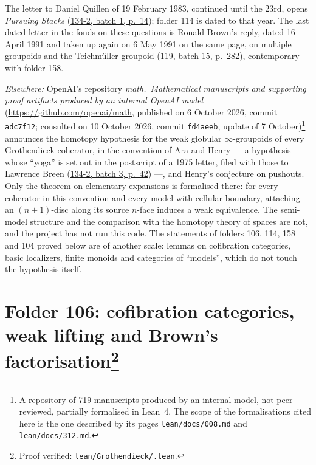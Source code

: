 \documentclass[11pt]{article}
\newcommand{\q}[1]{“#1”}
\newcommand{\lot}[3]{\href{https://grothendieck.commutator.io/\##1/#2/p#3}{#1, batch #2, p.~#3}}
\newcommand{\verifie}[1]{\footnote{Proof verified: \href{https://github.com/Commutator-IO/grothendieck-project/blob/article-lean-2026-10/lean/Grothendieck/#1.lean}{\texttt{lean/Grothendieck/\detokenize{#1}.lean}}.}}
\newcommand{\lettres}[1]{{\small #1\par}\medskip}
\newcommand{\ailleurs}[1]{{\small\textit{Elsewhere:} #1\par}\medskip}
\theoremstyle{plain}
\theoremstyle{definition}
\theoremstyle{remark}
\begin{document}
\lettres{The letter to Daniel Quillen of 19 February 1983, continued until the 23rd, opens \emph{Pursuing Stacks} (\lot{134-2}{1}{14}); folder 114 is dated to that year. The last dated letter in the fonds on these questions is Ronald Brown's reply, dated 16 April 1991 and taken up again on 6 May 1991 on the same page, on multiple groupoids and the Teichmüller groupoid (\lot{119}{15}{282}), contemporary with folder 158.}
\ailleurs{OpenAI's repository \emph{math.\ Mathematical manuscripts and supporting proof artifacts produced by an internal OpenAI model} (\url{https://github.com/openai/math}, published on 6 October 2026, commit \texttt{adc7f12}; consulted on 10 October 2026, commit \texttt{fd4aeeb}, update of 7 October)\footnote{A repository of 719 manuscripts produced by an internal model, not peer-reviewed, partially formalised in Lean~4. The scope of the formalisations cited here is the one described by its pages \texttt{lean/docs/008.md} and \texttt{lean/docs/312.md}.} announces the homotopy hypothesis for the weak globular $\infty$-groupoids of every Grothendieck coherator, in the convention of Ara and Henry --- a hypothesis whose \q{yoga} is set out in the postscript of a 1975 letter, filed with those to Lawrence Breen (\lot{134-2}{3}{42}) ---, and Henry's conjecture on pushouts. Only the theorem on elementary expansions is formalised there: for every coherator in this convention and every model with cellular boundary, attaching an $(n+1)$-disc along its source $n$-face induces a weak equivalence. The semi-model structure and the comparison with the homotopy theory of spaces are not, and the project has not run this code. The statements of folders 106, 114, 158 and 104 proved below are of another scale: lemmas on cofibration categories, basic localizers, finite monoids and categories of \q{models}, which do not touch the hypothesis itself.}

\section[Folder 106: cofibration categories, weak lifting and Brown's factorisation]{Folder 106: cofibration categories, weak lifting and Brown's factorisation\protect\verifie{Folder106}}\label{sec:106}
\end{document}
